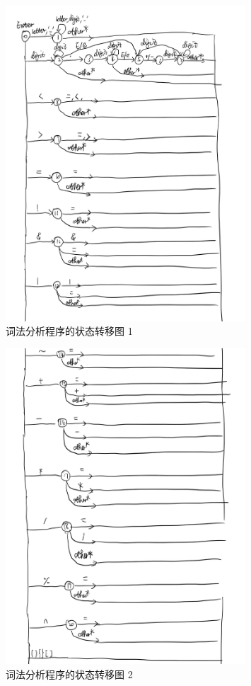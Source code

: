\begin{figure}
  \begin{center}
    \includegraphics[width=0.8\textwidth]{figures/Page1.jpg}
  \end{center}
  \caption{词法分析程序的状态转移图 1}
  \label{fig:StateFig1}
\end{figure}

\begin{figure}
  \begin{center}
    \includegraphics[width=0.8\textwidth]{figures/Page2.jpg}
  \end{center}
  \caption{词法分析程序的状态转移图 2}
  \label{fig:StateFig2}
\end{figure}

